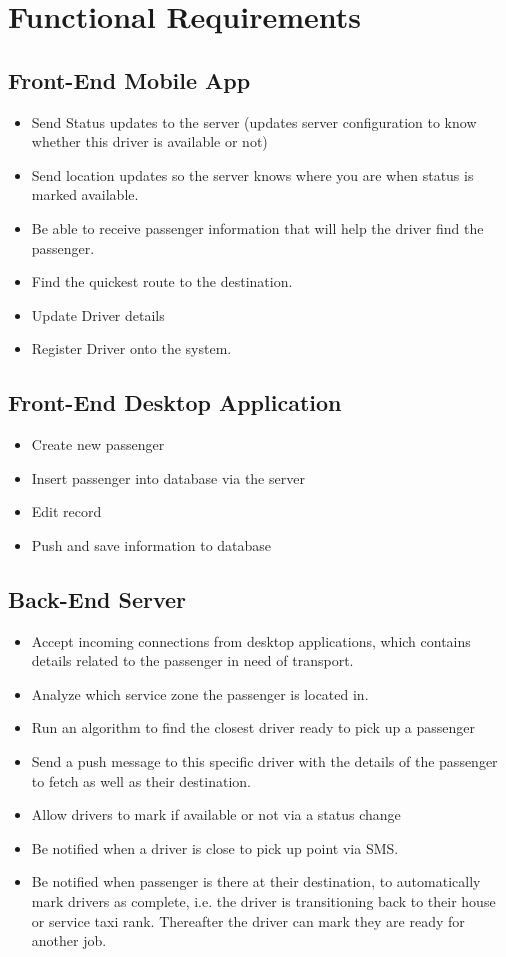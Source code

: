 \documentclass[a4paper,12pt]{article}
\begin{document}
\pagebreak
\section{Functional Requirements}
\subsection{Front-End Mobile App}
\begin{itemize}
\setlength\itemsep{0em}
\item Send Status updates to the server (updates server configuration to know whether this driver is available or not)
\item Send location updates so the server knows where you are when status is marked available.
\item Be able to receive passenger information that will help the driver find the passenger.
\item Find the quickest route to the destination.
\item Update Driver details
\item Register Driver onto the system.
\end{itemize}
\subsection{Front-End Desktop Application}
\begin{itemize}
\setlength\itemsep{0em}
\item Create new passenger
\item Insert passenger into database via the server
\item Edit record
\item Push and save information to database
\end{itemize}
\subsection{Back-End Server}
\begin{itemize}
\setlength\itemsep{0em}
\item Accept incoming connections from desktop applications, which contains details related to the passenger in need of transport.
\item Analyze which service zone the passenger is located in.
\item Run an algorithm to find the closest driver ready to pick up a passenger
\item Send a push message to this specific driver with the details of the passenger to fetch as well as their destination.
\item Allow drivers to mark if available or not via a status change
\item Be notified when a driver is close to pick up point via SMS.
\item Be notified when passenger is there at their destination, to automatically mark drivers as complete, i.e. the driver is transitioning back to their house or service taxi rank. Thereafter the driver can mark they are ready for another job.
\end{itemize}
\pagebreak
\end{document}
